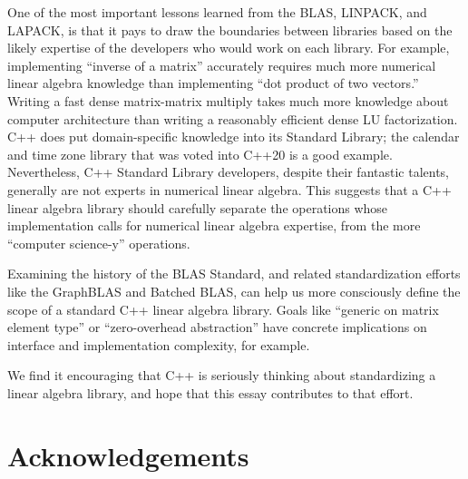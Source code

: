 One of the most important lessons learned from the BLAS, LINPACK, and
LAPACK, is that it pays to draw the boundaries between libraries based
on the likely expertise of the developers who would work on each
library.  For example, implementing ``inverse of a matrix'' accurately
requires much more numerical linear algebra knowledge than
implementing ``dot product of two vectors.''  Writing a fast dense
matrix-matrix multiply takes much more knowledge about computer
architecture than writing a reasonably efficient dense LU
factorization.  C++ does put domain-specific knowledge into its
Standard Library; the calendar and time zone library \cite{P0355r7}
that was voted into C++20 is a good example.  Nevertheless, C++
Standard Library developers, despite their fantastic talents,
generally are not experts in numerical linear algebra.  This suggests
that a C++ linear algebra library should carefully separate the
operations whose implementation calls for numerical linear algebra
expertise, from the more ``computer science-y'' operations.

Examining the history of the BLAS Standard, and related
standardization efforts like the GraphBLAS and Batched BLAS, can help
us more consciously define the scope of a standard C++ linear algebra
library.  Goals like ``generic on matrix element type'' or
``zero-overhead abstraction'' have concrete implications on interface
and implementation complexity, for example.

We find it encouraging that C++ is seriously thinking about
standardizing a linear algebra library, and hope that this essay
contributes to that effort.

\section{Acknowledgements}
\label{S:ack}

